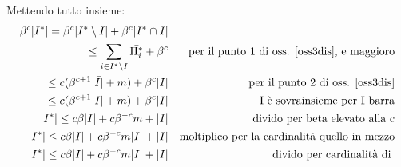Mettendo tutto insieme: 
\begin{equation}
    \begin{aligned}
        \beta^c|I^*| = \beta^c|I^* \setminus I| + \beta^c|I^* \cap I|\\
        \leq \sum_{i \in I^* \setminus I} \bar{\Pi_i^*} + \beta^c && \text{per il punto 1 di oss. \ref{oss3dis}, e maggioro}\\
        \leq c(\beta^{c+1}|\bar{I}| + m) + \beta^c |I|&& \text{per il punto 2 di oss. \ref{oss3dis}}\\
        \leq c(\beta^{c+1}|I| + m) + \beta^c |I|&& \text{I è sovrainsieme per I barra}\\
        |I^*| \leq c\beta|I| + c\beta^{-c}m + |I|&& \text{divido per beta elevato alla c}\\
        |I^*| \leq c\beta|I| + c\beta^{-c}m|I| + |I|&& \text{moltiplico per la cardinalità quello in mezzo}\\
        |I^*| \leq c\beta|I| + c\beta^{-c}m|I| + |I|&& \text{divido per cardinalità di }\\

    \end{aligned}
\end{equation}